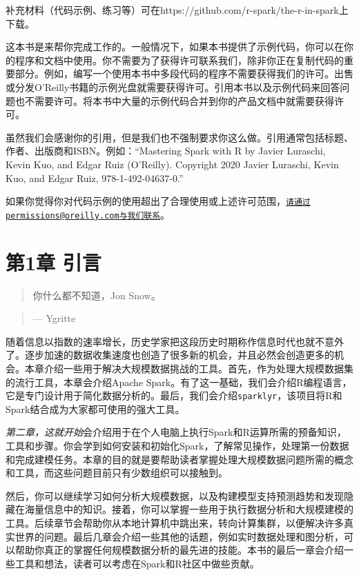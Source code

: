 \documentclass[
]{article}
\begin{document}
补充材料（代码示例、练习等）可在https://github.com/r-spark/the-r-in-spark上下载。

这本书是来帮你完成工作的。一般情况下，如果本书提供了示例代码，你可以在你的程序和文档中使用。你不需要为了获得许可联系我们，除非你正在复制代码的重要部分。例如，编写一个使用本书中多段代码的程序不需要获得我们的许可。出售或分发O'Reilly书籍的示例光盘就需要获得许可。引用本书以及示例代码来回答问题也不需要许可。将本书中大量的示例代码合并到你的产品文档中就需要获得许可。

虽然我们会感谢你的引用，但是我们也不强制要求你这么做。引用通常包括标题、作者、出版商和ISBN。例如：``Mastering
Spark with R by Javier Luraschi, Kevin Kuo, and Edgar Ruiz (O'Reilly).
Copyright 2020 Javier Luraschi, Kevin Kuo, and Edgar Ruiz,
978-1-492-04637-0.''

如果你觉得你对代码示例的使用超出了合理使用或上述许可范围，\href{mailto:请通过permissions@oreilly.com与我们联系}{\nolinkurl{请通过permissions@oreilly.com与我们联系}}。

\hypertarget{ux7b2c1ux7ae0-ux5f15ux8a00}{%
\section{第1章 引言}\label{ux7b2c1ux7ae0-ux5f15ux8a00}}

\begin{quote}
你什么都不知道，Jon Snow。
\end{quote}

\begin{quote}
--- Ygritte
\end{quote}

随着信息以指数的速率增长，历史学家把这段历史时期称作信息时代也就不意外了。逐步加速的数据收集速度也创造了很多新的机会，并且必然会创造更多的机会。本章介绍一些用于解决大规模数据挑战的工具。首先，作为处理大规模数据集的流行工具，本章会介绍Apache
Spark。有了这一基础，我们会介绍R编程语言，它是专门设计用于简化数据分析的。最后，我们会介绍\texttt{sparklyr}，该项目将R和Spark结合成为大家都可使用的强大工具。

\emph{第二章，这就开始}会介绍用于在个人电脑上执行Spark和R运算所需的预备知识，工具和步骤。你会学到如何安装和初始化Spark，了解常见操作，处理第一份数据和完成建模任务。本章的目的就是要帮助读者掌握处理大规模数据问题所需的概念和工具，而这些问题目前只有少数组织可以接触到。

然后，你可以继续学习如何分析大规模数据，以及构建模型支持预测趋势和发现隐藏在海量信息中的知识。接着，你可以掌握一些用于执行数据分析和大规模建模的工具。后续章节会帮助你从本地计算机中跳出来，转向计算集群，以便解决许多真实世界的问题。最后几章会介绍一些其他的话题，例如实时数据处理和图分析，可以帮助你真正的掌握任何规模数据分析的最先进的技能。本书的最后一章会介绍一些工具和想法，读者可以考虑在Spark和R社区中做些贡献。
\end{document}

